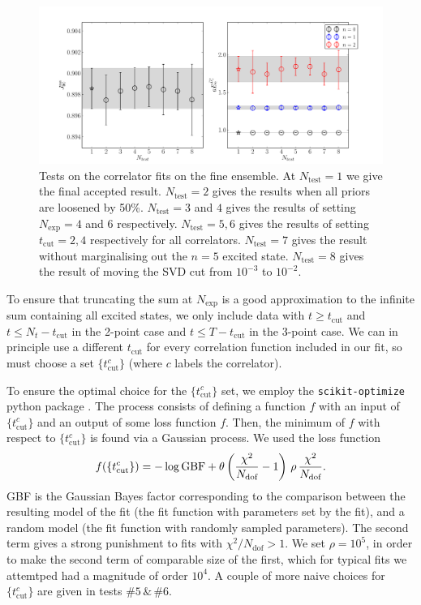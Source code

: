 \begin{figure}[htb!]
  \begin{center}
  \includegraphics[width=1.1\textwidth]{images/BsDsstar/fittests_fine.pdf}
  \caption{Tests on the correlator fits on the fine ensemble. At $N_{\text{test}}=1$ we give the final accepted result. $N_{\text{test}}=2$ gives the results when all priors are loosened by 50\%. $N_{\text{test}}=3$ and $4$ gives the results of setting $N_{\text{exp}}=4$ and $6$ respectively. $N_{\text{test}}=5,6$ gives the results of setting $t_{\text{cut}}=2,4$ respectively for all correlators. $N_{\text{test}}=7$ gives the result without marginalising out the $n=5$ excited state. $N_{\text{test}}=8$ gives the result of moving the SVD cut from $10^{-3}$ to $10^{-2}$. \label{fig:corr_fit_tests}}
  \end{center}
  \vspace{-10pt}
\end{figure}

To ensure that truncating the sum at $N_{\text{exp}}$ is a good approximation to the infinite sum containing all excited states, we only include data with  $t \geq t_{\text{cut}}$ and $t \leq N_t-t_{\text{cut}}$ in the 2-point case and $t \leq T-t_{\text{cut}}$ in the 3-point case. We can in principle use a different $t_{\text{cut}}$ for every correlation function included in our fit, so must choose a set $\{ t_{\text{cut}}^{c}\}$ (where $c$ labels the correlator).

To ensure the optimal choice for the $\{ t_{\text{cut}}^{c}\}$ set, we employ the \texttt{scikit-optimize} python package \cite{skopt}. The process consists of defining a function $f$ with an input of $\{ t_{\text{cut}}^{c}\}$ and an output of some loss function $f$. Then, the minimum of $f$ with respect to $\{ t_{\text{cut}}^{c}\}$ is found via a Gaussian process. We used the loss function
\begin{align}
  f(\{ t_{\text{cut}}^{c}\}) = - \log \text{GBF} + \theta\left({\chi^2\over N_{\text{dof}}}-1\right) \,\rho\, {\chi^2\over N_{\text{dof}}}.
\end{align}
GBF is the Gaussian Bayes factor corresponding to the comparison between the resulting model of the fit (the fit function with parameters set by the fit), and a random model (the fit function with randomly sampled parameters). The second term gives a strong punishment to fits with $\chi^2/N_{\text{dof}} > 1$. We set $\rho=10^5$, in order to make the second term of comparable size of the first, which for typical fits we attemtped had a magnitude of order $10^4$. A couple of more naive choices for $\{ t_{\text{cut}}^{c}\}$ are given in tests $\#5 \,\&\, \#6$.

